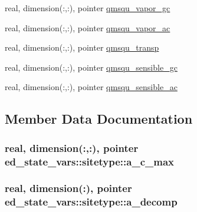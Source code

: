 \begin{DoxyCompactItemize}
\item 
real, dimension(\+:,\+:), pointer \hyperlink{structed__state__vars_1_1sitetype_a180d82dd02981c2aa354b6f2f51e6008}{qmsqu\+\_\+vapor\+\_\+gc}
\item 
real, dimension(\+:,\+:), pointer \hyperlink{structed__state__vars_1_1sitetype_afb44bb0c97b4276cb70271f1785e5bd8}{qmsqu\+\_\+vapor\+\_\+ac}
\item 
real, dimension(\+:,\+:), pointer \hyperlink{structed__state__vars_1_1sitetype_a6d17c468e38616e636781ed83a3e485e}{qmsqu\+\_\+transp}
\item 
real, dimension(\+:,\+:), pointer \hyperlink{structed__state__vars_1_1sitetype_a5b7ff6ba60a8be04de621315a7276972}{qmsqu\+\_\+sensible\+\_\+gc}
\item 
real, dimension(\+:,\+:), pointer \hyperlink{structed__state__vars_1_1sitetype_a34324082e85e336569454963aba5073d}{qmsqu\+\_\+sensible\+\_\+ac}
\end{DoxyCompactItemize}


\subsection{Member Data Documentation}
\subsubsection[{\texorpdfstring{a\+\_\+c\+\_\+max}{a_c_max}}]{\setlength{\rightskip}{0pt plus 5cm}real, dimension(\+:,\+:), pointer ed\+\_\+state\+\_\+vars\+::sitetype\+::a\+\_\+c\+\_\+max}\hypertarget{structed__state__vars_1_1sitetype_a0765d713375aea9867c18bdf672d5bf4}{}\label{structed__state__vars_1_1sitetype_a0765d713375aea9867c18bdf672d5bf4}
\subsubsection[{\texorpdfstring{a\+\_\+decomp}{a_decomp}}]{\setlength{\rightskip}{0pt plus 5cm}real, dimension(\+:), pointer ed\+\_\+state\+\_\+vars\+::sitetype\+::a\+\_\+decomp}\hypertarget{structed__state__vars_1_1sitetype_abf769bdda3d37bad1e3423df185e2c55}{}\label{structed__state__vars_1_1sitetype_abf769bdda3d37bad1e3423df185e2c55}
